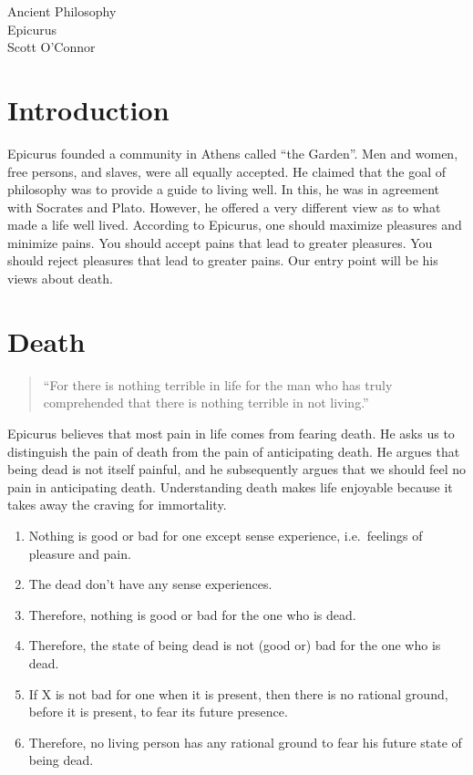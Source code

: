 \documentclass[11pt]{article}
\begin{document}
\thispagestyle{empty}
\begin{center} \LARGE{Ancient Philosophy\\ Epicurus}\\ \vspace*{2mm}
\large{Scott O'Connor}\end{center}
\thispagestyle{empty}\vspace*{3mm}

\section*{Introduction}

Epicurus founded a community in Athens called ``the Garden''. Men and
women, free persons, and slaves, were all equally accepted. He claimed that the goal of philosophy was to provide a guide to living
well. In this, he was in agreement with Socrates and Plato. However, he
offered a very different view as to what made a life well lived. According to Epicurus, one should maximize pleasures and minimize pains. You should accept pains that lead to greater pleasures. You should reject pleasures that lead to greater pains. Our entry point will be his views about death. 

\section*{Death}\label{death}

\begin{quote}
``For there is nothing terrible in life for the man who has truly
comprehended that there is nothing terrible in not living.''
 \end{quote}
Epicurus believes that most pain in life comes from fearing death. He asks us to distinguish the pain of death  from the pain of anticipating death. He argues that being dead is not itself painful, and he subsequently argues that we should feel no pain in anticipating death.  Understanding death makes life enjoyable because it takes away the craving for immortality.



\begin{enumerate}
\item Nothing is good or bad for one except sense experience, i.e.~feelings of pleasure and pain. 
\item The dead don't have any sense experiences. 
\item Therefore, nothing is good or bad for the one who is dead. 
\item Therefore, the state of being dead is not (good or) bad for the one who is dead. 
\item If X is not bad for one when it is present, then there is no rational
ground, before it is present, to fear its future presence. 
\item Therefore, no living person has any rational ground to fear his future state of being dead.
\end{enumerate}
\end{document}
